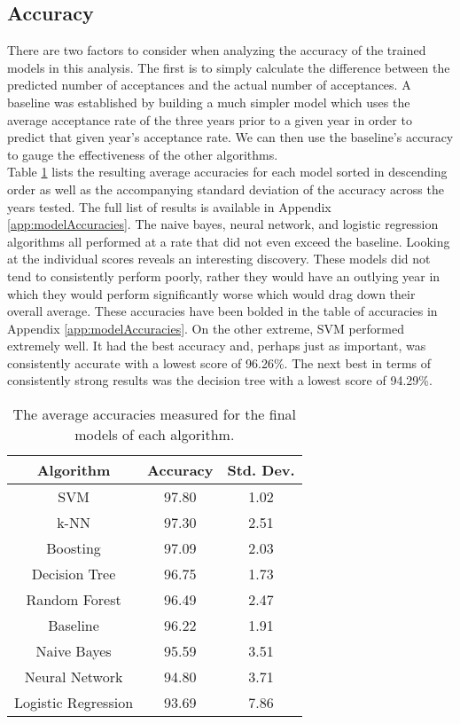 \documentclass[titlepage]{article}
\begin{document}
\subsection{Accuracy}
There are two factors to consider when analyzing the accuracy of the trained models in this analysis. The first is to simply calculate the difference between the predicted number of acceptances and the actual number of acceptances. A baseline was established by building a much simpler model which uses the average acceptance rate of the three years prior to a given year in order to predict that given year's acceptance rate. We can then use the baseline's accuracy to gauge the effectiveness of the other algorithms.\\
Table \ref{tab:accuracies} lists the resulting average accuracies for each model sorted in descending order as well as the accompanying standard deviation of the accuracy across the years tested. The full list of results is available in Appendix \ref{app:modelAccuracies}. The naive bayes, neural network, and logistic regression algorithms all performed at a rate that did not even exceed the baseline. Looking at the individual scores reveals an interesting discovery. These models did not tend to consistently perform poorly, rather they would have an outlying year in which they would perform significantly worse which would drag down their overall average. These accuracies have been bolded in the table of accuracies in Appendix \ref{app:modelAccuracies}. On the other extreme, SVM performed extremely well. It had the best accuracy and, perhaps just as important, was consistently accurate with a lowest score of 96.26\%. The next best in terms of consistently strong results was the decision tree with a lowest score of 94.29\%.
\begin{table}[!b]
\begin{center}
\begin{tabular}{c|c|c}
	\textbf{Algorithm}		&\textbf{Accuracy}	&\textbf{Std. Dev.}\\\hline
	SVM						&97.80				&1.02\\
	k-NN					&97.30				&2.51\\
	Boosting				&97.09				&2.03\\
	Decision Tree			&96.75				&1.73\\
	Random Forest			&96.49				&2.47\\
	Baseline				&96.22				&1.91\\
	Naive Bayes				&95.59				&3.51\\
	Neural Network			&94.80				&3.71\\
	Logistic Regression		&93.69				&7.86
\end{tabular}
\end{center}
\caption{The average accuracies measured for the final models of each algorithm.}
\label{tab:accuracies}
\end{table}~\\
\end{document}
